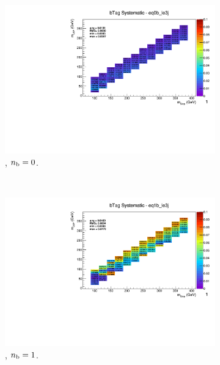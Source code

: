 \begin{figure}[ht!]
\begin{subfigure}[b]{0.32\textwidth}
    \includegraphics[width=\textwidth, page=1]{Figs/sms/t2degen/v19/systs/T2_4body_bTag_eq0b_le3j.pdf}
    \caption{\njlow, $n_{\text{b}} = 0$.}
  \end{subfigure}\\
  \begin{subfigure}[b]{0.32\textwidth}
    \includegraphics[width=\textwidth, page=12]{Figs/sms/t2degen/v19/systs/T2_4body_bTag_eq1b_le3j.pdf}
    \caption{\njlow, $n_{\text{b}} = 1$.}
  \end{subfigure}
  \begin{subfigure}[b]{0.32\textwidth}

\end{subfigure}
\end{figure}
